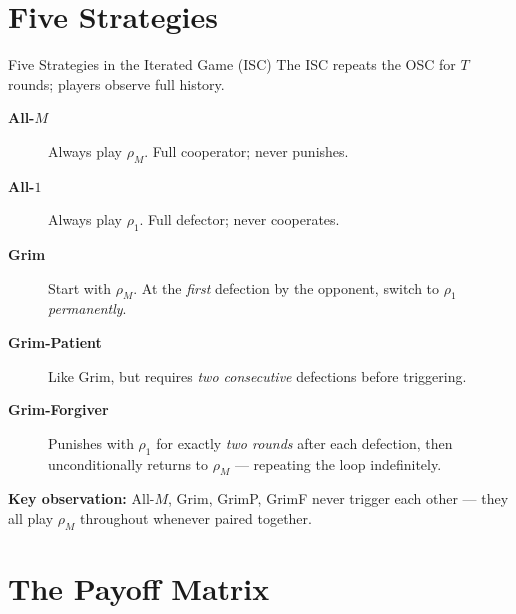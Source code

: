 \documentclass[aspectratio=169]{beamer}
\begin{document}
\section{Five Strategies}

\begin{frame}{Five Strategies in the Iterated Game (ISC)}
  The ISC repeats the OSC for $T$ rounds; players observe full history.
  \vspace{6pt}
  \begin{description}
    \item[\textbf{All-$M$}] Always play $\rho_M$. Full cooperator; never punishes.
    \item[\textbf{All-$1$}] Always play $\rho_1$. Full defector; never cooperates.
    \item[\textbf{Grim}] Start with $\rho_M$. At the \emph{first} defection by the opponent, switch to $\rho_1$ \emph{permanently}.
    \item[\textbf{Grim-Patient}] Like Grim, but requires \emph{two consecutive} defections before triggering.
    \item[\textbf{Grim-Forgiver}] Punishes with $\rho_1$ for exactly \emph{two rounds} after each defection, then unconditionally returns to $\rho_M$ --- repeating the loop indefinitely.
  \end{description}
  \vspace{6pt}
  \textbf{Key observation:} All-$M$, Grim, GrimP, GrimF never trigger each other --- they all play $\rho_M$ throughout whenever paired together.
\end{frame}

\section{The Payoff Matrix}
\end{document}
